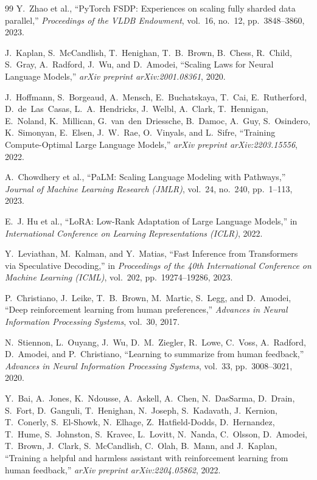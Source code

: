 \documentclass{book}
\begin{document}
\begin{thebibliography}{99}
Y.~Zhao et al., ``PyTorch FSDP: Experiences on scaling fully sharded data parallel,'' \textit{Proceedings of the VLDB Endowment}, vol.~16, no.~12, pp.~3848--3860, 2023.
 
J.~Kaplan, S.~McCandlish, T.~Henighan, T.~B.~Brown, B.~Chess, R.~Child, S.~Gray, A.~Radford, J.~Wu, and D.~Amodei, ``Scaling Laws for Neural Language Models,'' \textit{arXiv preprint arXiv:2001.08361}, 2020.
 
J.~Hoffmann, S.~Borgeaud, A.~Mensch, E.~Buchatskaya, T.~Cai, E.~Rutherford, D.~de~Las~Casas, L.~A.~Hendricks, J.~Welbl, A.~Clark, T.~Hennigan, E.~Noland, K.~Millican, G.~van~den~Driessche, B.~Damoc, A.~Guy, S.~Osindero, K.~Simonyan, E.~Elsen, J.~W.~Rae, O.~Vinyals, and L.~Sifre, ``Training Compute-Optimal Large Language Models,'' \textit{arXiv preprint arXiv:2203.15556}, 2022.
 
A.~Chowdhery et al., ``PaLM: Scaling Language Modeling with Pathways,'' \textit{Journal of Machine Learning Research (JMLR)}, vol.~24, no.~240, pp.~1--113, 2023.
 
E.~J. Hu et al., ``LoRA: Low-Rank Adaptation of Large Language Models,'' in \textit{International Conference on Learning Representations (ICLR)}, 2022.
 
Y.~Leviathan, M.~Kalman, and Y.~Matias, ``Fast Inference from Transformers via Speculative Decoding,'' in \textit{Proceedings of the 40th International Conference on Machine Learning (ICML)}, vol.~202, pp.~19274--19286, 2023.
 
P.~Christiano, J.~Leike, T.~B.~Brown, M.~Martic, S.~Legg, and D.~Amodei, ``Deep reinforcement learning from human preferences,'' \textit{Advances in Neural Information Processing Systems}, vol.~30, 2017.
 
N.~Stiennon, L.~Ouyang, J.~Wu, D.~M.~Ziegler, R.~Lowe, C.~Voss, A.~Radford, D.~Amodei, and P.~Christiano, ``Learning to summarize from human feedback,'' \textit{Advances in Neural Information Processing Systems}, vol.~33, pp.~3008--3021, 2020.
 
Y.~Bai, A.~Jones, K.~Ndousse, A.~Askell, A.~Chen, N.~DasSarma, D.~Drain, S.~Fort, D.~Ganguli, T.~Henighan, N.~Joseph, S.~Kadavath, J.~Kernion, T.~Conerly, S.~El-Showk, N.~Elhage, Z.~Hatfield-Dodds, D.~Hernandez, T.~Hume, S.~Johnston, S.~Kravec, L.~Lovitt, N.~Nanda, C.~Olsson, D.~Amodei, T.~Brown, J.~Clark, S.~McCandlish, C.~Olah, B.~Mann, and J.~Kaplan, ``Training a helpful and harmless assistant with reinforcement learning from human feedback,'' \textit{arXiv preprint arXiv:2204.05862}, 2022.
 

\end{thebibliography}
\end{document}
